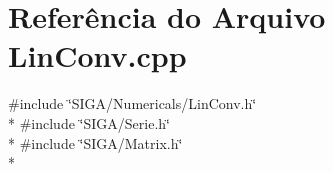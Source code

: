 \section{Referência do Arquivo Lin\+Conv.\+cpp}
\label{_lin_conv_8cpp}
{\ttfamily \#include \char`\"{}S\+I\+G\+A/\+Numericals/\+Lin\+Conv.\+h\char`\"{}}\\*
{\ttfamily \#include \char`\"{}S\+I\+G\+A/\+Serie.\+h\char`\"{}}\\*
{\ttfamily \#include \char`\"{}S\+I\+G\+A/\+Matrix.\+h\char`\"{}}\\*
